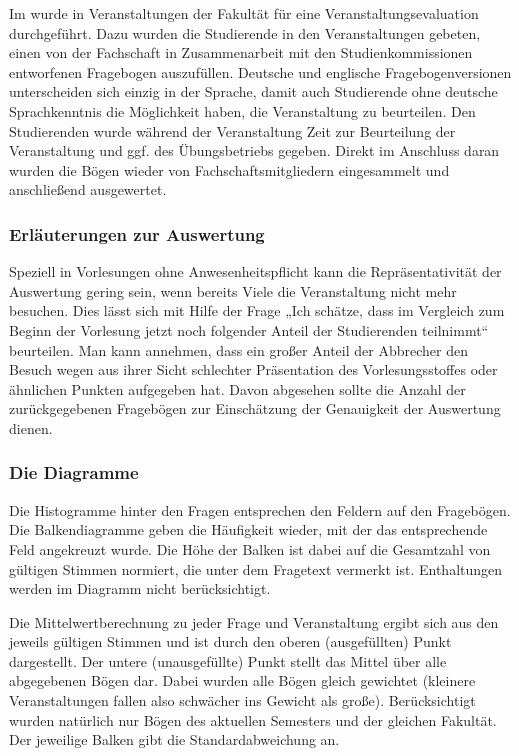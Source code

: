 Im \semesterlong{} wurde in Veranstaltungen der Fakultät für
\facultylong{} eine Veranstaltungsevaluation durchgeführt. Dazu
wurden die Studierende in den Veranstaltungen gebeten, einen von
der Fachschaft in Zusammenarbeit mit den Studienkommissionen
entworfenen Fragebogen auszufüllen. Deutsche und englische
Fragebogenversionen unterscheiden sich einzig in der Sprache, damit
auch Studierende ohne deutsche Sprachkenntnis die Möglichkeit
haben, die Veranstaltung zu beurteilen. Den Studierenden wurde
während der Veranstaltung Zeit zur Beurteilung der Veranstaltung
und ggf. des Übungsbetriebs gegeben. Direkt im Anschluss daran
wurden die Bögen wieder von Fachschaftsmitgliedern eingesammelt und
anschließend ausgewertet.


\subsubsection{Erläuterungen zur Auswertung}

Speziell in Vorlesungen ohne Anwesenheitspflicht kann die
Repräsentativität der Auswertung gering sein, wenn bereits Viele
die Veranstaltung nicht mehr besuchen. Dies lässt sich mit Hilfe
der Frage  „Ich schätze, dass im Vergleich zum Beginn der Vorlesung
jetzt noch folgender Anteil der Studierenden teilnimmt“ beurteilen.
Man kann annehmen, dass ein großer Anteil der Abbrecher den Besuch
wegen aus ihrer Sicht schlechter Präsentation des Vorlesungsstoffes
oder ähnlichen Punkten aufgegeben hat. Davon abgesehen sollte die
Anzahl der zurückgegebenen Fragebögen zur Einschätzung der Genauigkeit
der Auswertung dienen.



\subsubsection{Die Diagramme}

Die Histogramme hinter den Fragen entsprechen den Feldern auf den
Fragebögen. Die Balkendiagramme geben die Häufigkeit wieder, mit
der das entsprechende Feld angekreuzt wurde. Die Höhe der Balken
ist dabei auf die Gesamtzahl von gültigen Stimmen normiert, die
unter dem Fragetext vermerkt ist. Enthaltungen werden im Diagramm
nicht berücksichtigt.

Die Mittelwertberechnung zu jeder Frage und Veranstaltung ergibt
sich aus den jeweils gültigen Stimmen und ist durch den oberen
(ausgefüllten) Punkt dargestellt. Der untere (unausgefüllte) Punkt
stellt das Mittel über alle abgegebenen Bögen dar. Dabei wurden
alle Bögen gleich gewichtet (kleinere Veranstaltungen fallen also
schwächer ins Gewicht als große). Berücksichtigt wurden natürlich
nur Bögen des aktuellen Semesters und der gleichen Fakultät. Der
jeweilige Balken gibt die Standardabweichung an.

